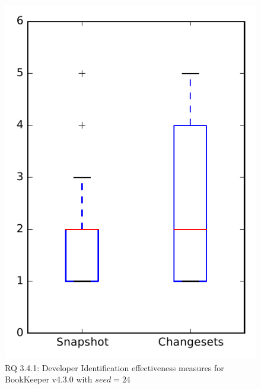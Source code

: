 
\begin{figure}
\centering
\includegraphics[height=0.4\textheight]{figures/dit_seed/rq1_bookkeeper_24}
\caption{RQ 3.4.1: Developer Identification effectiveness measures for BookKeeper v4.3.0 with $seed=24$}
\label{fig:dit_seed:rq1:bookkeeper}
\end{figure}
